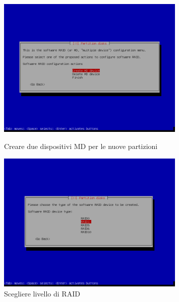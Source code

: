 \documentclass[11pt]{article}
\begin{document}
\begin{figure}[H]
    \includegraphics[width=0.8\textwidth, keepaspectratio]{../img/raid install/raid11.png}
    \centering
    \caption{Creare due dispositivi MD per le nuove partizioni}

    \includegraphics[width=0.8\textwidth, keepaspectratio]{../img/raid install/raid12.png}
    \centering
    \caption{Scegliere livello di RAID}
\end{figure}
\end{document}

